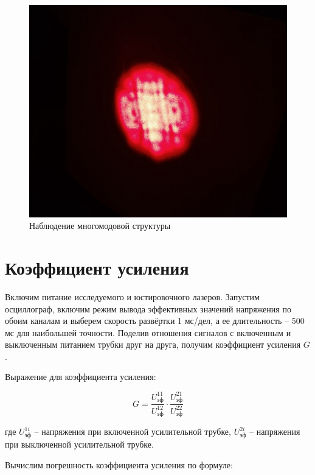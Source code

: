 	\begin{figure}[h!]
		\centering
		\includegraphics[scale=0.5]{images/Многомодовый.jpg}
		\caption{Наблюдение многомодовой структуры}
		\label{image:amount_modes}
	\end{figure}

	\newpage
    
    \section*{Коэффициент усиления}
    
    Включим питание исследуемого и юстировочного лазеров. Запустим осциллограф, включим режим вывода эффективных значений напряжения по обоим каналам и выберем скорость развёртки 1 мс/дел, а ее длительность -- 500 мс для наибольшей точности. Поделив отношения сигналов с  включенным и выключенным питанием трубки друг на друга, получим коэффициент усиления $G$.
    
    Выражение для коэффициента усиления:
    
    \begin{equation} \label{equation:intensity}
    	G = \frac{U_{\text{эф}}^{11}}{U_{\text{эф}}^{12}} \cdot \frac{U_{\text{эф}}^{21}}{U_{\text{эф}}^{22}}
    \end{equation}
    
    где $U_{\text{эф}}^{1i}$ -- напряжения при включенной усилительной трубке, $U_{\text{эф}}^{2i}$ -- напряжения при выключенной усилительной трубке.
    
    Вычислим погрешность коэффициента усиления по формуле:
    
